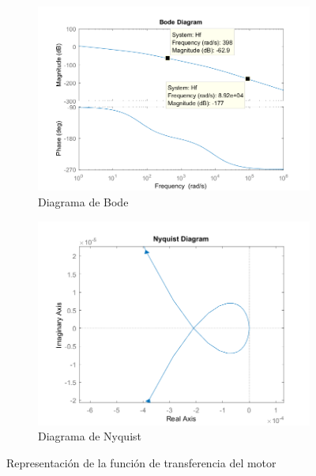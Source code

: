 \documentclass[a4paper]{article}
\begin{document}
\begin{figure}[htp]
	\begin{subfigure}{1\textwidth}
		\centering
		\includegraphics[width=\textwidth]{bode}
		\caption{Diagrama de Bode}
	\end{subfigure}

	\begin{subfigure}{1\textwidth}
		\centering
		\includegraphics[width=\textwidth]{nyquist}
		\caption{Diagrama de Nyquist}
	\end{subfigure}
	\caption{Representación de la función de transferencia del motor}
	\label{bode}
\end{figure}
\end{document}
